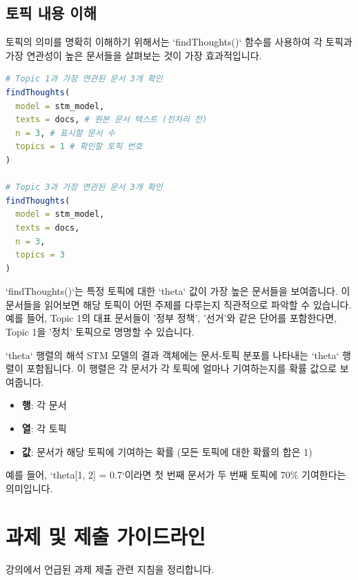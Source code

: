 \documentclass[11pt,a4paper]{article}
\begin{document}
\subsection{토픽 내용 이해}
토픽의 의미를 명확히 이해하기 위해서는 `findThoughts()` 함수를 사용하여 각 토픽과 가장 연관성이 높은 문서들을 살펴보는 것이 가장 효과적입니다.

\begin{lstlisting}[language=R, caption={토픽별 대표 문서 확인 (`findThoughts`)}, label={lst:find_thoughts}]
# Topic 1과 가장 연관된 문서 3개 확인
findThoughts(
  model = stm_model,
  texts = docs, # 원본 문서 텍스트 (전처리 전)
  n = 3, # 표시할 문서 수
  topics = 1 # 확인할 토픽 번호
)

# Topic 3과 가장 연관된 문서 3개 확인
findThoughts(
  model = stm_model,
  texts = docs,
  n = 3,
  topics = 3
)
\end{lstlisting}
`findThoughts()`는 특정 토픽에 대한 `theta` 값이 가장 높은 문서들을 보여줍니다. 이 문서들을 읽어보면 해당 토픽이 어떤 주제를 다루는지 직관적으로 파악할 수 있습니다. 예를 들어, Topic 1의 대표 문서들이 '정부 정책', '선거'와 같은 단어를 포함한다면, Topic 1을 '정치' 토픽으로 명명할 수 있습니다.

\begin{definitionbox}{`theta` 행렬의 해석}
STM 모델의 결과 객체에는 문서-토픽 분포를 나타내는 `theta` 행렬이 포함됩니다. 이 행렬은 각 문서가 각 토픽에 얼마나 기여하는지를 확률 값으로 보여줍니다.
\begin{itemize}
    \item \textbf{행}: 각 문서
    \item \textbf{열}: 각 토픽
    \item \textbf{값}: 문서가 해당 토픽에 기여하는 확률 (모든 토픽에 대한 확률의 합은 1)
\end{itemize}
예를 들어, `theta[1, 2] = 0.7`이라면 첫 번째 문서가 두 번째 토픽에 70\% 기여한다는 의미입니다.
\end{definitionbox}

\newpage
\section*{과제 및 제출 가이드라인}
강의에서 언급된 과제 제출 관련 지침을 정리합니다.
\end{document}
